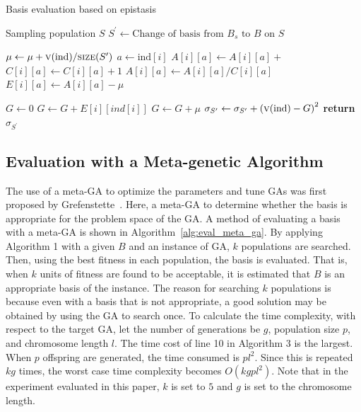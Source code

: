 \begin{algorithm}[H]
	\caption{Basis evaluation based on epistasis} \label{alg:eval_epi}
	\begin{algorithmic}[1]
		\Require Sampling population $S$
		 
		\State $S^{\prime} \gets \text{Change of basis from } B_s \text{ to } B \text{ on } S $ 
		\State
		
		\State $\mu \gets \mu + \text{\Call{v}{ind}/\Call{size}{$S^\prime$}}$
		\State $ a \gets \text{ind}[i]$ 
		\State $A[i][a] \gets A[i][a] +$ 
		\State $C[i][a] \gets C[i][a] + 1$ 
		\EndFor
		\EndFor
		\State
		\State $A[i][a] \gets A[i][a] / C[i][a]$
		\State $E[i][a] \gets A[i][a] -\mu$
		\EndFor
		\EndFor
		\State
		
		\State $G \gets 0$ 
		\State $G \gets G + E[i][ind[i]]$
		\EndFor
		\State $G \gets G + \mu$
		\State $\sigma_{S^\prime} \gets \sigma_{S^\prime} + \left(\text{\Call{v}{ind}}-G\right)^2$ 
		\EndFor
		\State \textbf{return} $\sigma_{S^\prime}$
		\EndProcedure
	\end{algorithmic}
\end{algorithm}


\subsection{Evaluation with a Meta-genetic Algorithm}
The use of a meta-GA to optimize the parameters and tune GAs was first proposed by Grefenstette~\cite{Grefenstette:1986:OCP:14111.14123}. Here, a meta-GA to determine whether the basis is appropriate for the problem space of the GA. A method of evaluating a basis with a meta-GA is shown in Algorithm~\ref{alg:eval_meta_ga}. By applying Algorithm 1 with a given $ B $ and an instance of GA, $ k $ populations are searched. Then, using the best fitness in each population, the basis is evaluated. That is, when $ k $ units of fitness are found to be acceptable, it is estimated that $ B $ is an appropriate basis of the instance. The reason for searching $ k $ populations is because even with a basis that is not appropriate, a good solution may be obtained by using the GA to search once. To calculate the time complexity, with respect to the target GA, let the number of generations be $ g $, population size $ p $, and chromosome length $ l $. The time cost of line 10 in Algorithm 3 is the largest. When $ p $ offspring are generated, the time consumed is $ pl^2 $. Since this is repeated $ kg $ times, the worst case time complexity becomes $ O(kgpl^2) $. Note that in the experiment evaluated in this paper, $ k $ is set to $ 5 $ and $ g $ is set to the chromosome length.

